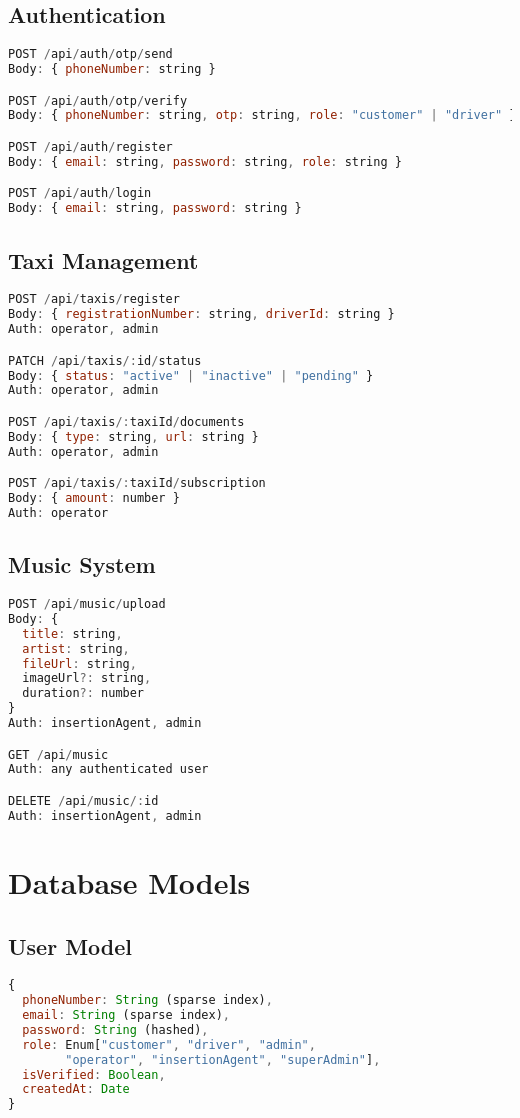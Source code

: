 \documentclass[11pt,a4paper]{article}
\begin{document}
\subsection{Authentication}
\begin{lstlisting}[language=javascript]
POST /api/auth/otp/send
Body: { phoneNumber: string }

POST /api/auth/otp/verify
Body: { phoneNumber: string, otp: string, role: "customer" | "driver" }

POST /api/auth/register
Body: { email: string, password: string, role: string }

POST /api/auth/login
Body: { email: string, password: string }
\end{lstlisting}

\subsection{Taxi Management}
\begin{lstlisting}[language=javascript]
POST /api/taxis/register
Body: { registrationNumber: string, driverId: string }
Auth: operator, admin

PATCH /api/taxis/:id/status
Body: { status: "active" | "inactive" | "pending" }
Auth: operator, admin

POST /api/taxis/:taxiId/documents
Body: { type: string, url: string }
Auth: operator, admin

POST /api/taxis/:taxiId/subscription
Body: { amount: number }
Auth: operator
\end{lstlisting}

\subsection{Music System}
\begin{lstlisting}[language=javascript]
POST /api/music/upload
Body: { 
  title: string, 
  artist: string, 
  fileUrl: string, 
  imageUrl?: string, 
  duration?: number 
}
Auth: insertionAgent, admin

GET /api/music
Auth: any authenticated user

DELETE /api/music/:id
Auth: insertionAgent, admin
\end{lstlisting}

\section{Database Models}
\subsection{User Model}
\begin{lstlisting}[language=javascript]
{
  phoneNumber: String (sparse index),
  email: String (sparse index),
  password: String (hashed),
  role: Enum["customer", "driver", "admin", 
        "operator", "insertionAgent", "superAdmin"],
  isVerified: Boolean,
  createdAt: Date
}
\end{lstlisting}
\end{document}
